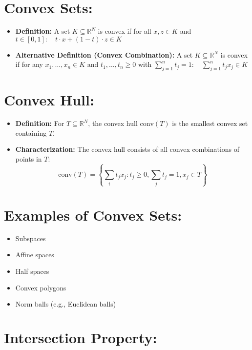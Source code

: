 \documentclass{article}
\begin{document}
\section*{Convex Sets:}

\begin{itemize}[leftmargin=*]
    \item \textbf{Definition:} A set \( K \subseteq \mathbb{R}^N \) is convex if for all \( x, z \in K \) and \( t \in [0, 1]: \quad t \cdot x + (1 - t) \cdot z \in K \)
    \item \textbf{Alternative Definition (Convex Combination):} A set \( K \subseteq \mathbb{R}^N \) is convex if for any \( x_1, \ldots, x_n \in K \) and \( t_1, \ldots, t_n \geq 0 \) with \( \sum_{j=1}^n t_j = 1: \quad \sum_{j=1}^n t_j x_j \in K \)
\end{itemize}

\section*{Convex Hull:}

\begin{itemize}[leftmargin=*]
    \item \textbf{Definition:} For \( T \subseteq \mathbb{R}^N \), the convex hull \( \text{conv}(T) \) is the smallest convex set containing \( T \).
    \item \textbf{Characterization:} The convex hull consists of all convex combinations of points in \( T \):
    \[
    \text{conv}(T) = \left\{ \sum_{i} t_j x_j : t_j \geq 0, \sum_{j} t_j = 1, x_j \in T \right\}
    \]
\end{itemize}

\section*{Examples of Convex Sets:}

\begin{itemize}[leftmargin=*]
    \item Subspaces
    \item Affine spaces
    \item Half spaces
    \item Convex polygons
    \item Norm balls (e.g., Euclidean balls)
\end{itemize}

\section*{Intersection Property:}
\end{document}
